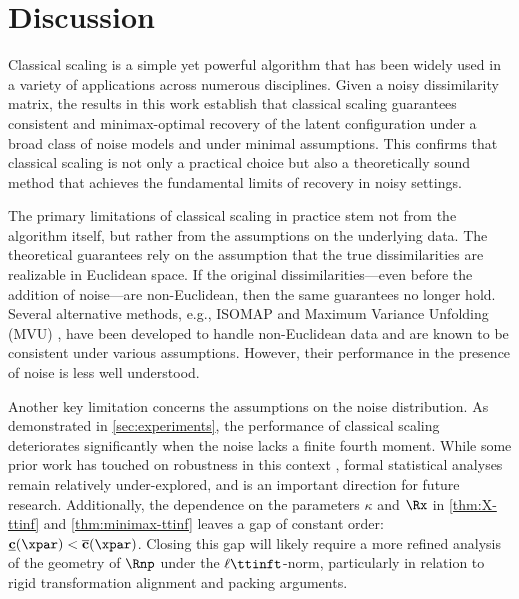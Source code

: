 \documentclass[10pt]{article}
\begin{document}




















\section{Discussion}
\label{sec:discussion}

Classical scaling is a simple yet powerful algorithm that has been widely used in a variety of applications across numerous disciplines. Given a noisy dissimilarity matrix, the results in this work establish that classical scaling guarantees consistent and minimax-optimal recovery of the latent configuration under a broad class of noise models and under minimal assumptions. This confirms that classical scaling is not only a practical choice but also a theoretically sound method that achieves the fundamental limits of recovery in noisy settings.

The primary limitations of classical scaling in practice stem not from the algorithm itself, but rather from the assumptions on the underlying data. The theoretical guarantees rely on the assumption that the true dissimilarities are realizable in Euclidean space. If the original dissimilarities---even before the addition of noise---are non-Euclidean, then the same guarantees no longer hold. Several alternative methods, e.g., ISOMAP \citep{tenenbaum2000global} and Maximum Variance Unfolding (MVU) \citep{weinberger2006graph}, have been developed to handle non-Euclidean data and are known to be consistent under various assumptions. However, their performance in the presence of noise is less well understood.

Another key limitation concerns the assumptions on the noise distribution. As demonstrated in \cref{sec:experiments}, the performance of classical scaling deteriorates significantly when the noise lacks a finite fourth moment. While some prior work has touched on robustness in this context \citep[e.g.,][]{cayton2006robust,mandanas2016robust}, formal statistical analyses remain relatively under-explored, and is an important direction for future research. Additionally, the dependence on the parameters $\kappa$ and $\Rx$ in \cref{thm:X-ttinf} and \cref{thm:minimax-ttinf} leaves a gap of constant order: $\mathbf{\underline{c}}(\xpar) < \mathbf{\overline{c}}(\xpar)$. Closing this gap will likely require a more refined analysis of the geometry of $\Rnp$ under the $\ell\ttinft$-norm, particularly in relation to rigid transformation alignment and packing arguments.
\end{document}
